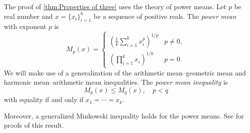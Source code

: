 \documentclass[twoside]{article}
\DeclareMathOperator{\tsum}{\textstyle \sum}
\begin{document}
The proof of \cref{thm:Properties of three} uses the theory of power means. Let $p$ be real number and $x=\{x_{i}\} _{i=1}^{k}$ be a sequence
of positive reals. The \textit{power mean} with exponent $p$ is
\[
M_{p}(x)=\begin{cases}
(\frac{1}{k}\tsum_{i=1}^{k}x_{i}^{p})^{1/p} & p\neq0,\\
(\prod_{i=1}^{k}x_{i})^{1/k} & p=0.
\end{cases}
\]
We will make use of a generalization of the arithmetic mean--geometric mean and harmonic mean--arithmetic mean inequalities. The \textit{power mean inequality} \citep[][Chapter III]{Bullen2013-os} is
\begin{equation}
M_{p}(x)\leq M_{q}(x),\quad p<q\label{eq:generalized mean inequality}
\end{equation}
with equality if and only if $x_{1}=\cdots=x_{k}$. 

Moreover, a generalized Minkowski inequality holds for the power means. See \citep[][Section 2.4, Theorem 9.]{Bullen2013-os} for proofs of this result.
\end{document}
